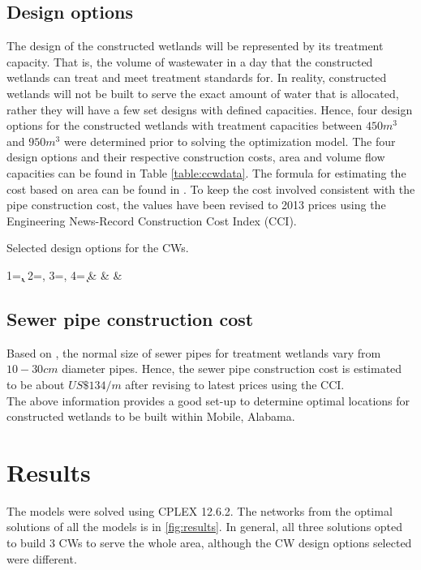 \documentclass[preprint,12pt,authoryear]{elsarticle}
\begin{document}
\subsection{Design options} 
The design of the constructed wetlands will be represented by its treatment capacity. That is, the volume of wastewater in a day that the constructed wetlands can treat and meet treatment standards for. In reality, constructed wetlands will not be built to serve the exact amount of water that is allocated, rather they will have a few set designs with defined capacities. Hence, four design options for the constructed wetlands with treatment capacities between $450m^3$ and $950m^3$ were determined prior to solving the optimization model. The four design options and their respective construction costs, area and volume flow capacities can be found in Table \ref{table:ccwdata}. The formula for estimating the cost based on area can be found in \cite{kadlec2009}. To keep the cost involved consistent with the pipe construction cost, the values have been revised to 2013 prices using the Engineering News-Record Construction Cost Index (CCI). 
\begin{table}[!h]
	\centering
	\captionsetup{justification=centering}
	\caption[Design options.]{Selected design options for the CWs.}
	\label{table:cwdata}
            		{1=\k, 2=\q, 3=\a, 4=\cost}
            		{\k & \q & \a & \cost}
\end{table}

\subsection{Sewer pipe construction cost} 
Based on \cite{kadlec2009}, the normal size of sewer pipes for treatment wetlands vary from $10-30 cm$ diameter pipes. Hence, the sewer pipe construction cost is estimated to be about $US\$134/m$ \citep{usepa2000} after revising to latest prices using the CCI. \\

The above information provides a good set-up to determine optimal locations for constructed wetlands to be built within Mobile, Alabama. 

\section{Results}
The models were solved using CPLEX 12.6.2. The networks from the optimal solutions of all the models is in \autoref{fig:results}.  In general, all three solutions opted to build 3 CWs to serve the whole area, although the CW design options selected were different. 
\end{document}
